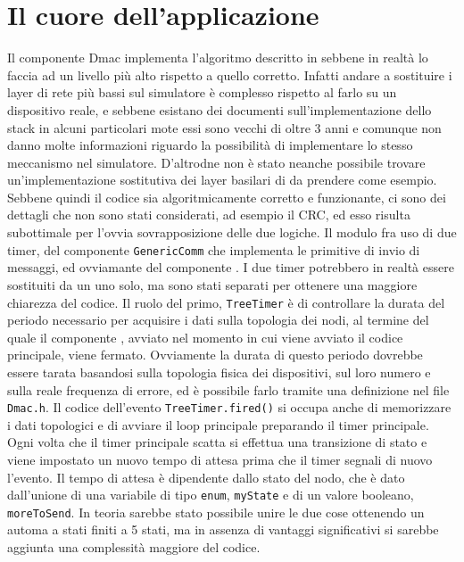 \documentclass[twoside,11pt,a4paper,italian,openany]{book}
\begin{document}
\section{Il cuore dell'applicazione}
Il componente Dmac implementa l'algoritmo descritto in \cite{DMAC} sebbene in realtà lo faccia 
ad un livello più alto rispetto a quello corretto. Infatti andare a sostituire i layer di rete 
più bassi sul simulatore è complesso rispetto al farlo su un dispositivo reale, 
e sebbene esistano dei documenti sull'implementazione dello stack in alcuni particolari mote\cite{stackpdf} essi sono vecchi di oltre 3 anni e comunque non danno molte informazioni riguardo la
possibilità di implementare lo stesso meccanismo nel simulatore. 
D'altrodne non è stato neanche possibile trovare 
un'implementazione sostitutiva dei layer basilari di \tos da prendere come esempio. 
Sebbene quindi il codice sia algoritmicamente corretto e funzionante,
ci sono dei dettagli che non sono stati considerati, ad esempio il CRC, ed esso risulta 
subottimale per l'ovvia sovrapposizione delle due logiche. 
Il modulo fra uso di due timer, del componente \texttt{GenericComm}  che implementa le 
primitive di invio di messaggi, ed ovviamante del componente \tree. 
I due timer potrebbero in realtà essere sostituiti da un uno solo, ma sono stati separati 
per ottenere una maggiore chiarezza del codice.
Il ruolo del primo, \texttt{TreeTimer} è di controllare la durata del periodo necessario per
acquisire i dati sulla topologia dei nodi, al termine del quale il componente \tree, avviato 
nel momento in cui viene avviato il codice principale, viene fermato.
Ovviamente la durata di questo periodo dovrebbe essere tarata basandosi sulla topologia fisica 
dei dispositivi, sul loro numero e sulla reale frequenza di errore, ed è possibile farlo 
tramite una definizione nel file \texttt{Dmac.h}.
Il codice dell'evento \texttt{TreeTimer.fired()} si occupa anche di memorizzare i dati topologici
e di avviare il loop principale preparando il timer principale. 
Ogni volta che il timer principale scatta si effettua una transizione di stato e viene 
impostato un nuovo tempo di attesa prima che il timer segnali di nuovo l'evento. 
Il tempo di attesa è dipendente dallo stato del nodo, che è dato dall'unione di una variabile 
di tipo \texttt{enum}, \texttt{myState} e di un valore booleano, \texttt{moreToSend}. 
In teoria sarebbe stato possibile unire le due cose ottenendo un automa a stati finiti a 
5 stati, ma in assenza di vantaggi significativi si sarebbe aggiunta una complessità maggiore 
del codice. 
\end{document}
